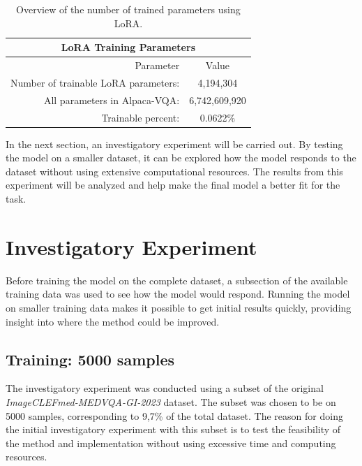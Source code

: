     \begin{table}[htb]
    \centering
    \begin{tabular}{ r c } 
        \multicolumn{2}{c}{\textbf{LoRA Training Parameters}}\\
        \toprule
           Parameter & Value \\
        \midrule
            Number of trainable LoRA parameters: & 4,194,304\\
            All parameters in Alpaca-VQA: & 6,742,609,920\\
            Trainable percent: & 0.0622\%\\[0.5ex]
        \bottomrule
    \end{tabular}
    \caption{Overview of the number of trained parameters using LoRA.}
    \label{table:lora_parms}
    \end{table}

    In the next section, an investigatory experiment will be carried out. By testing the model on a smaller dataset, it can be explored how the model responds to the dataset without using extensive computational resources. The results from this experiment will be analyzed and help make the final model a better fit for the task. 


\section{Investigatory Experiment}

Before training the model on the complete dataset, a subsection of the available training data was used to see how the model would respond. Running the model on smaller training data makes it possible to get initial results quickly, providing insight into where the method could be improved. 

    \subsection{Training: 5000 samples}

    The investigatory experiment was conducted using a subset of the original \textit{ImageCLEFmed-MEDVQA-GI-2023} dataset. The subset was chosen to be on 5000 samples, corresponding to 9,7\% of the total dataset. The reason for doing the initial investigatory experiment with this subset is to test the feasibility of the method and implementation without using excessive time and computing resources. 
    
    

